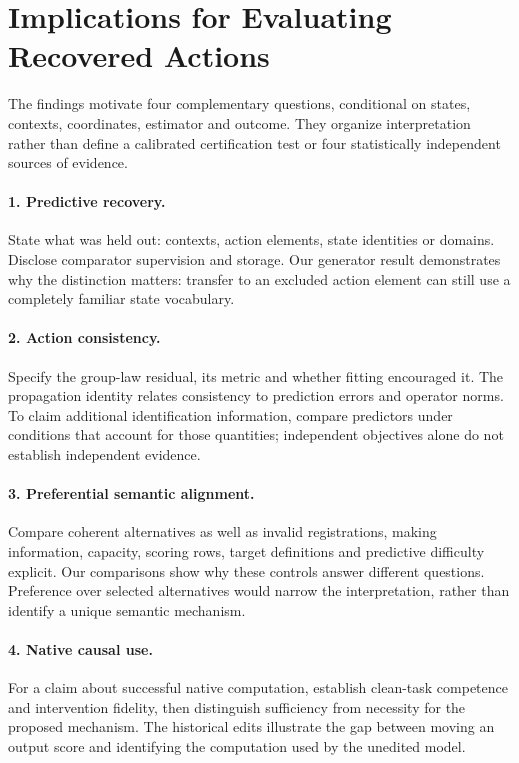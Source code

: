 \documentclass{article}
\begin{document}
\section{Implications for Evaluating Recovered Actions}
\label{sec:reading-protocol}
The findings motivate four complementary questions, conditional on states, contexts, coordinates, estimator and outcome. They organize interpretation rather than define a calibrated certification test or four statistically independent sources of evidence.

\paragraph{1. Predictive recovery.}
State what was held out: contexts, action elements, state identities or domains. Disclose comparator supervision and storage. Our generator result demonstrates why the distinction matters: transfer to an excluded action element can still use a completely familiar state vocabulary.

\paragraph{2. Action consistency.}
Specify the group-law residual, its metric and whether fitting encouraged it. The propagation identity relates consistency to prediction errors and operator norms. To claim additional identification information, compare predictors under conditions that account for those quantities; independent objectives alone do not establish independent evidence.

\paragraph{3. Preferential semantic alignment.}
Compare coherent alternatives as well as invalid registrations, making information, capacity, scoring rows, target definitions and predictive difficulty explicit. Our comparisons show why these controls answer different questions. Preference over selected alternatives would narrow the interpretation, rather than identify a unique semantic mechanism.

\paragraph{4. Native causal use.}
For a claim about successful native computation, establish clean-task competence and intervention fidelity, then distinguish sufficiency from necessity for the proposed mechanism. The historical edits illustrate the gap between moving an output score and identifying the computation used by the unedited model.
\end{document}
